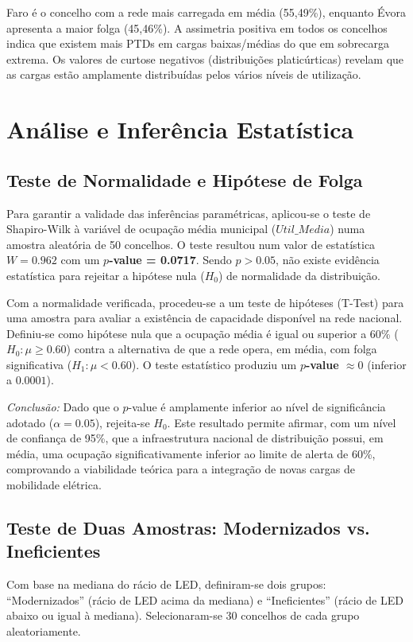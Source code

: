 \documentclass[conference]{IEEEtran}
\begin{document}
Faro é o concelho com a rede mais carregada em média (55,49\%), enquanto Évora apresenta a maior folga (45,46\%). A assimetria positiva em todos os concelhos indica que existem mais PTDs em cargas baixas/médias do que em sobrecarga extrema. Os valores de curtose negativos (distribuições platicúrticas) revelam que as cargas estão amplamente distribuídas pelos vários níveis de utilização.

\section{Análise e Inferência Estatística}
\subsection{Teste de Normalidade e Hipótese de Folga}

Para garantir a validade das inferências paramétricas, aplicou-se o teste de Shapiro-Wilk à variável de ocupação média municipal ($Util\_Media$) numa amostra aleatória de 50 concelhos. O teste resultou num valor de estatística $W = 0.962$ com um \textbf{$p$-value = 0.0717}. Sendo $p > 0.05$, não existe evidência estatística para rejeitar a hipótese nula ($H_0$) de normalidade da distribuição.

Com a normalidade verificada, procedeu-se a um teste de hipóteses (T-Test) para uma amostra para avaliar a existência de capacidade disponível na rede nacional. Definiu-se como hipótese nula que a ocupação média é igual ou superior a 60\% ($H_0: \mu \ge 0.60$) contra a alternativa de que a rede opera, em média, com folga significativa ($H_1: \mu < 0.60$). O teste estatístico produziu um \textbf{$p$-value $\approx 0$} (inferior a $0.0001$).

\textit{Conclusão:} Dado que o $p$-value é amplamente inferior ao nível de significância adotado ($\alpha = 0.05$), rejeita-se $H_0$. Este resultado permite afirmar, com um nível de confiança de 95\%, que a infraestrutura nacional de distribuição possui, em média, uma ocupação significativamente inferior ao limite de alerta de 60\%, comprovando a viabilidade teórica para a integração de novas cargas de mobilidade elétrica.

\subsection{Teste de Duas Amostras: Modernizados vs. Ineficientes}

Com base na mediana do rácio de LED, definiram-se dois grupos: ``Modernizados'' (rácio de LED acima da mediana) e ``Ineficientes'' (rácio de LED abaixo ou igual à mediana). Selecionaram-se 30 concelhos de cada grupo aleatoriamente.
\end{document}
